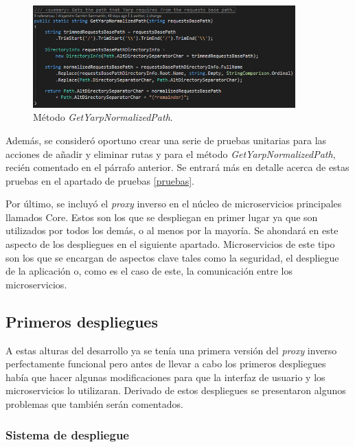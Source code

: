 \documentclass[11pt,spanish,listoffigures]{tfgetsinf}
\begin{document}
\begin{figure}[ht]
\centering
\includegraphics[width=0.9\textwidth]{imagenes/getYarpNormalizedPath}
\caption{Método \emph{GetYarpNormalizedPath}.}
	\label{getYarpNormalizedPath}
\end{figure}

Además, se consideró oportuno crear una serie de pruebas unitarias para las acciones de añadir y eliminar rutas y para el método \emph{GetYarpNormalizedPath}, recién comentado en el párrafo anterior. Se entrará más en detalle acerca de estas pruebas en el apartado de pruebas \ref{pruebas}.

Por último, se incluyó el \emph{proxy} inverso en el núcleo de microservicios principales llamados Core. Estos son los que se despliegan en primer lugar ya que son utilizados por todos los demás, o al menos por la mayoría. Se ahondará en este aspecto de los despliegues en el siguiente apartado. Microservicios de este tipo son los que se encargan de aspectos clave tales como la seguridad, el despliegue de la aplicación o, como es el caso de este, la comunicación entre los microservicios.


		\subsection{Primeros despliegues}

A estas alturas del desarrollo ya se tenía una primera versión del \emph{proxy} inverso perfectamente funcional pero antes de llevar a cabo los primeros despliegues había que hacer algunas modificaciones para que la interfaz de usuario y los microservicios lo utilizaran. Derivado de estos despliegues se presentaron algunos problemas que también serán comentados.


			\subsubsection{Sistema de despliegue}
\end{document}

